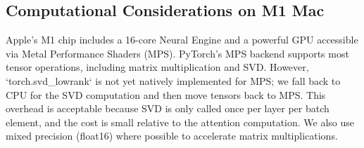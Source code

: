 \subsection{Computational Considerations on M1 Mac}
Apple's M1 chip includes a 16-core Neural Engine and a powerful GPU accessible via Metal Performance Shaders (MPS). PyTorch's MPS backend supports most tensor operations, including matrix multiplication and SVD. However, `torch.svd\_lowrank` is not yet natively implemented for MPS; we fall back to CPU for the SVD computation and then move tensors back to MPS. This overhead is acceptable because SVD is only called once per layer per batch element, and the cost is small relative to the attention computation. We also use mixed precision (float16) where possible to accelerate matrix multiplications.